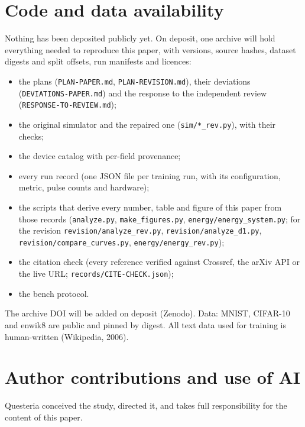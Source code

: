 








\section{Code and data availability}\label{sec:availability}
\begin{sloppypar}
Nothing has been deposited publicly yet. On deposit, one archive will hold everything needed to reproduce this paper, with
versions, source hashes, dataset digests and split offsets, run manifests and licences:
\begin{itemize}
\item the plans (\texttt{PLAN-PAPER.md}, \texttt{PLAN-REVISION.md}), their deviations (\texttt{DEVIATIONS-PAPER.md}) and the
      response to the independent review (\texttt{RESPONSE-TO-REVIEW.md});
\item the original simulator and the repaired one (\texttt{sim/*\_rev.py}), with their checks;
\item the device catalog with per-field provenance;
\item every run record (one JSON file per training run, with its configuration, metric, pulse counts and hardware);
\item the scripts that derive every number, table and figure of this paper from those records (\texttt{analyze.py},
      \texttt{make\_figures.py}, \texttt{energy/energy\_system.py}; for the revision \texttt{revision/analyze\_rev.py},
      \texttt{revision/analyze\_d1.py}, \texttt{revision/compare\_curves.py}, \texttt{energy/energy\_rev.py});
\item the citation check (every reference verified against Crossref, the arXiv API or the live URL;
      \texttt{records/CITE-CHECK.json});
\item the bench protocol.
\end{itemize}
The archive DOI will be added on deposit (Zenodo). Data: MNIST, CIFAR-10 and enwik8 are public and pinned by digest. All text
data used for training is human-written (Wikipedia, 2006).

\end{sloppypar}

\section*{Author contributions and use of AI}
\ifdefined\arxivvariant
Questeria conceived the study, directed it, and takes full responsibility for the content of this paper.

